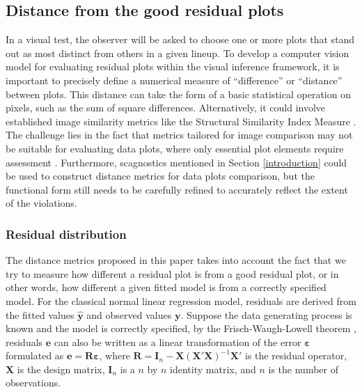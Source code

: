 \documentclass[]{interact}
\theoremstyle{plain}%
\theoremstyle{definition}
\theoremstyle{remark}
\begin{document}
\hypertarget{distance-from-the-good-residual-plots}{%
\subsection{Distance from the good residual
plots}\label{distance-from-the-good-residual-plots}}

In a visual test, the observer will be asked to choose one or more plots
that stand out as most distinct from others in a given lineup. To
develop a computer vision model for evaluating residual plots within the
visual inference framework, it is important to precisely define a
numerical measure of ``difference'' or ``distance'' between plots. This
distance can take the form of a basic statistical operation on pixels,
such as the sum of square differences. Alternatively, it could involve
established image similarity metrics like the Structural Similarity
Index Measure \citep{wang2004image}. The challenge lies in the fact that
metrics tailored for image comparison may not be suitable for evaluating
data plots, where only essential plot elements require assessment
\citep{chowdhury2018measuring}. Furthermore, scagnostics mentioned in
Section \ref{introduction} could be used to construct distance metrics
for data plots comparison, but the functional form still needs to be
carefully refined to accurately reflect the extent of the violations.

\hypertarget{residual-distribution}{%
\subsubsection{Residual distribution}\label{residual-distribution}}

The distance metrics proposed in this paper takes into account the fact
that we try to measure how different a residual plot is from a good
residual plot, or in other words, how different a given fitted model is
from a correctly specified model. For the classical normal linear
regression model, residuals are derived from the fitted values
\(\hat{\boldsymbol{y}}\) and observed values \(\boldsymbol{y}\). Suppose
the data generating process is known and the model is correctly
specified, by the Frisch-Waugh-Lowell theorem \citep{frisch1933partial},
residuals \(\boldsymbol{e}\) can also be written as a linear
transformation of the error \(\boldsymbol{\varepsilon}\) formulated as
\(\boldsymbol{e} = \boldsymbol{R}\boldsymbol{\varepsilon}\), where
\(\boldsymbol{R}=\boldsymbol{I}_n -\boldsymbol{X}(\boldsymbol{X}'\boldsymbol{X})^{-1}\boldsymbol{X}'\)
is the residual operator, \(\boldsymbol{X}\) is the design matrix,
\(\boldsymbol{I}_n\) is a \(n\) by \(n\) identity matrix, and \(n\) is
the number of observations.
\end{document}

